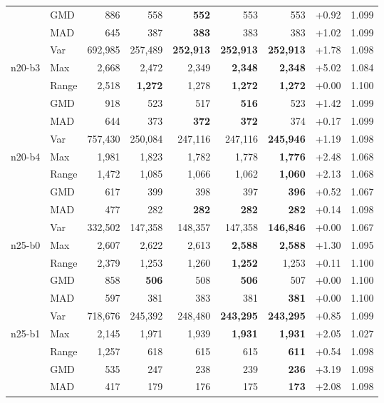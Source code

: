 \begin{small}
\begin{longtable}{llrrrrrrr}
 & GMD & 886 & 558 & \textbf{552} & 553 & 553 & +0.92 & 1.099 \\
 & MAD & 645 & 387 & \textbf{383} & 383 & 383 & +1.02 & 1.099 \\
 & Var & 692,985 & 257,489 & \textbf{252,913} & \textbf{252,913} & \textbf{252,913} & +1.78 & 1.098 \\
n20-b3 & Max & 2,668 & 2,472 & 2,349 & \textbf{2,348} & \textbf{2,348} & +5.02 & 1.084 \\
 & Range & 2,518 & \textbf{1,272} & 1,278 & \textbf{1,272} & \textbf{1,272} & +0.00 & 1.100 \\
 & GMD & 918 & 523 & 517 & \textbf{516} & 523 & +1.42 & 1.099 \\
 & MAD & 644 & 373 & \textbf{372} & \textbf{372} & 374 & +0.17 & 1.099 \\
 & Var & 757,430 & 250,084 & 247,116 & 247,116 & \textbf{245,946} & +1.19 & 1.098 \\
n20-b4 & Max & 1,981 & 1,823 & 1,782 & 1,778 & \textbf{1,776} & +2.48 & 1.068 \\
 & Range & 1,472 & 1,085 & 1,066 & 1,062 & \textbf{1,060} & +2.13 & 1.068 \\
 & GMD & 617 & 399 & 398 & 397 & \textbf{396} & +0.52 & 1.067 \\
 & MAD & 477 & 282 & \textbf{282} & \textbf{282} & \textbf{282} & +0.14 & 1.098 \\
 & Var & 332,502 & 147,358 & 148,357 & 147,358 & \textbf{146,846} & +0.00 & 1.067 \\
n25-b0 & Max & 2,607 & 2,622 & 2,613 & \textbf{2,588} & \textbf{2,588} & +1.30 & 1.095 \\
 & Range & 2,379 & 1,253 & 1,260 & \textbf{1,252} & 1,253 & +0.11 & 1.100 \\
 & GMD & 858 & \textbf{506} & 508 & \textbf{506} & 507 & +0.00 & 1.100 \\
 & MAD & 597 & 381 & 383 & 381 & \textbf{381} & +0.00 & 1.100 \\
 & Var & 718,676 & 245,392 & 248,480 & \textbf{243,295} & \textbf{243,295} & +0.85 & 1.099 \\
n25-b1 & Max & 2,145 & 1,971 & 1,939 & \textbf{1,931} & \textbf{1,931} & +2.05 & 1.027 \\
 & Range & 1,257 & 618 & 615 & 615 & \textbf{611} & +0.54 & 1.098 \\
 & GMD & 535 & 247 & 238 & 239 & \textbf{236} & +3.19 & 1.098 \\
 & MAD & 417 & 179 & 176 & 175 & \textbf{173} & +2.08 & 1.098 \\

\end{longtable}
\end{small}
